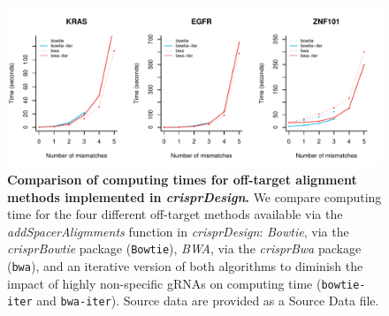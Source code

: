 \documentclass[pdftex,english,10pt]{article}
\begin{document}
\renewcommand{\figurename}{Supplementary Figure}
\setcounter{figure}{0}
\makeatletter 
\renewcommand{\thefigure}{\@arabic\c@figure}
\makeatother




\begin{figure}[!h]
\centering
\includegraphics[width=1\textwidth]{../analyses/offtargets/figures/offtarget_comparison.pdf}
  \caption{\textbf{Comparison of computing times for off-target alignment methods implemented in \textit{crisprDesign}.} 
  We compare computing time for the four different off-target methods available via the  \textit{addSpacerAligmments} function in \textit{crisprDesign}: \textit{Bowtie}, via the \textit{crisprBowtie} package (\texttt{Bowtie}), \textit{BWA}, via the \textit{crisprBwa} package (\texttt{bwa}), and an iterative version of both algorithms to diminish the impact of highly non-specific gRNAs on computing time (\texttt{bowtie-iter} and \texttt{bwa-iter}). Source data are provided as a Source Data file.
  }
  \label{suppfig:offtargets}
\end{figure}
\end{document}
